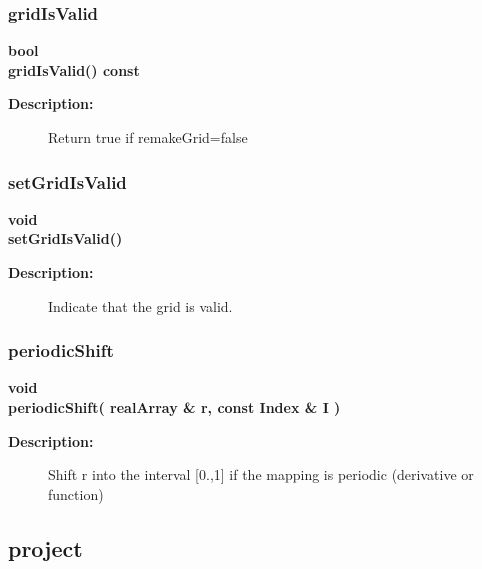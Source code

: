 \subsubsection{gridIsValid}
 
\begin{flushleft} \textbf{%
bool   \\ 
\settowidth{\MappingIncludeArgIndent}{gridIsValid(}%
gridIsValid() const
}\end{flushleft}
\begin{description}
\item[{\bf Description:}] 
   Return true if remakeGrid=false
\end{description}
\subsubsection{setGridIsValid}
 
\begin{flushleft} \textbf{%
void  \\ 
\settowidth{\MappingIncludeArgIndent}{setGridIsValid(}%
setGridIsValid() 
}\end{flushleft}
\begin{description}
\item[{\bf Description:}] 
   Indicate that the grid is valid.
\end{description}
\subsubsection{periodicShift}
 
\begin{flushleft} \textbf{%
void  \\ 
\settowidth{\MappingIncludeArgIndent}{periodicShift(}%
periodicShift( realArray \& r, const Index \& I )
}\end{flushleft}
\begin{description}
\item[{\bf Description:}] 
   Shift r into the interval [0.,1] if the mapping is periodic (derivative or function)
\end{description}
\subsection{project}
 
